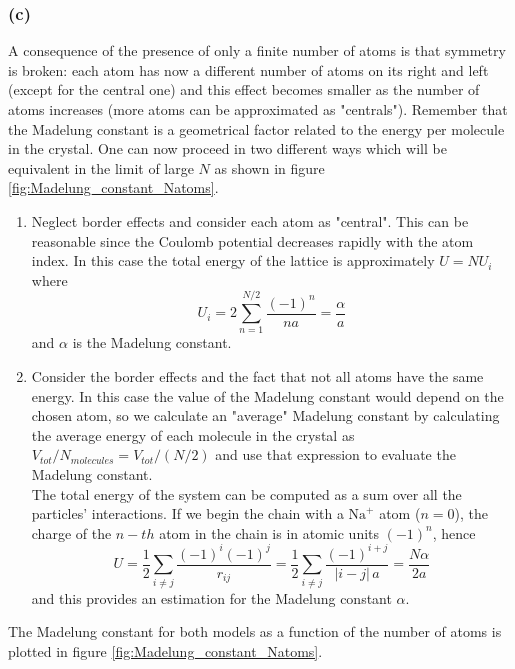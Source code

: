 \documentclass{article}
\begin{document}
\subsubsection*{(c)}
A consequence of the presence of only a finite number of atoms is that symmetry is broken: each atom has now a different number of atoms on its right and left (except for the central one) and this 
effect becomes smaller as the number of atoms increases (more atoms can be approximated as "centrals"). Remember that the Madelung constant is a geometrical factor related to the energy per molecule in the crystal. 
One can now proceed in two different ways which will be equivalent in the limit of large $N$ as shown in figure \ref{fig:Madelung_constant_Natoms}.
\begin{enumerate}
    \item Neglect border effects and consider each atom as "central". This can be reasonable since the Coulomb potential decreases rapidly with the atom index. In this case the total energy of the lattice is approximately
    $U = NU_i$ where
    $$ U_i = 2\sum_{n=1}^{N/2}\frac{(-1)^n}{n a} = \frac{\alpha}{a}$$
    and $\alpha$ is the Madelung constant.
    \item Consider the border effects and the fact that not all atoms have the same energy. In this case the value of the Madelung constant would depend on the chosen atom, so we calculate an "average" Madelung constant by calculating the average energy of each molecule in the crystal as $V_{tot}/N_{molecules} = V_{tot}/(N/2)$ and use that expression to evaluate the Madelung constant. \\
        The total energy of the system can be computed as a sum over all the particles' interactions. If we begin the chain with a $\text{Na}^+$ atom ($n=0$), the charge of the $n-th$ atom in the chain is in atomic units $(-1)^n$, hence
        $$U = \frac{1}{2} \sum_{i \neq j} \frac{(-1)^i(-1)^j}{r_{ij}} = \frac{1}{2} \sum_{i \neq j} \frac{(-1)^{i+j}}{|i-j| \, a} =
        \frac{N\alpha}{2a}$$
        and this provides an estimation for the Madelung constant $\alpha$.
\end{enumerate} 
The Madelung constant for both models as a function of the number of atoms is plotted in figure \ref{fig:Madelung_constant_Natoms}.
\end{document}

